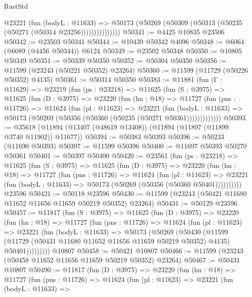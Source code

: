 \begin{lexlean}{RustStd}
\begin{coremodule}
                  @23221
                    (fun (bodyL : @11633) =>
                    @50173 (@50269 (@50309 (@50313 (@50235 (@50271 (@50314 @23256)))))))))))))))
@50341 := @4425 @10835 @23506
@50342 := @23503 @50341
@50344 := @10439 @50342 @4096
@50348 := @6064 (@6089 (@4456 @50344)) @6124
@50349 := @23502 @50348
@50350 := @10805 @50349
@50351 := @50339 @50350
@50352 := @50304 @50350
@50356 := @11599 (@23243 (@50221 @50352) @23264)
@50360 := @11599 (@11729 (@50226 @50352) @4135)
@50361 := @50314 @50350
@50383 := @11881
    (fun (Γ : @11629) =>
    @23219
      (fun (ps : @23218) =>
      @11625
        (fun (S : @3975) =>
        @11625
          (fun (D : @3975) =>
          @23220
            (fun (hn : @18) =>
            @11727
              (fun (pns : @11726) =>
              @11624
                (fun (pl : @11623) =>
                @23221
                  (fun (bodyL : @11633) =>
                  @50173 (@50269 (@50356 (@50360 (@50235 (@50271 @50361)))))))))))))
@50393 := @35618 (@11894 (@13407 (@48619 @13408)) (@11894 (@11897 (@11899 @3740 @11902)) @11677))
@50394 := @50383 @50393
@50396 := @50233 (@11690 @50393)
@50397 := @11599 @50396
@50400 := @11697 @50393 @50270 @50361
@50401 := @50397 @50400
@50420 := @23561
    (fun (ps : @23218) =>
    @11625
      (fun (S : @3975) =>
      @11625
        (fun (D : @3975) =>
        @23220
          (fun (hn : @18) =>
          @11727
            (fun (pns : @11726) =>
            @11624
              (fun (pl : @11623) =>
              @23221 (fun (bodyL : @11633) => @50173 (@50269 (@50356 (@50360 @50401))))))))))
    @23596
@50421 := @50118 @23596
@50430 := @11599 (@23243 (@50421 @11680 @11652 @11656 @11659 @50219 @50352) @23264)
@50431 := @50129 @23596
@50457 := @11817
    (fun (S : @3975) =>
    @11625
      (fun (D : @3975) =>
      @23220
        (fun (hn : @18) =>
        @11727
          (fun (pns : @11726) =>
          @11624
            (fun (pl : @11623) =>
            @23221
              (fun (bodyL : @11633) =>
              @50173
                (@50269
                  (@50430
                    (@11599
                      (@11729 (@50431 @11680 @11652 @11656 @11659 @50219 @50352) @4135)
                      @50401)))))))))
    @10807
@50458 := @50421 @10807
@50466 := @11599 (@23243 (@50458 @11652 @11656 @11659 @50219 @50352) @23264)
@50467 := @50431 @10807
@50490 := @11817
    (fun (D : @3975) =>
    @23220
      (fun (hn : @18) =>
      @11727
        (fun (pns : @11726) =>
        @11624
          (fun (pl : @11623) =>
          @23221
            (fun (bodyL : @11633) =>

\end{coremodule}
\end{lexlean}
